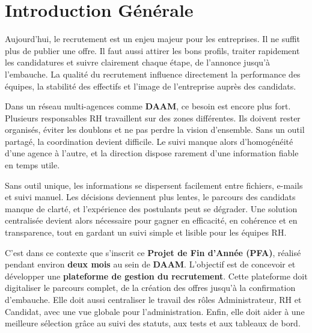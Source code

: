 \chapter*{Introduction Générale}
\thispagestyle{plain}

\begingroup
{}
\setlength{\parskip}{0.55em}

Aujourd'hui, le recrutement est un enjeu majeur pour les entreprises. Il ne
suffit plus de publier une offre. Il faut aussi attirer les bons profils, traiter
rapidement les candidatures et suivre clairement chaque étape, de l'annonce
jusqu'à l'embauche. La qualité du recrutement influence directement la performance
des équipes, la stabilité des effectifs et l'image de l'entreprise auprès des
candidats.

Dans un réseau multi-agences comme \textbf{DAAM}, ce besoin est encore plus fort.
Plusieurs responsables RH travaillent sur des zones différentes. Ils doivent rester
organisés, éviter les doublons et ne pas perdre la vision d'ensemble. Sans un outil
partagé, la coordination devient difficile. Le suivi manque alors d'homogénéité
d'une agence à l'autre, et la direction dispose rarement d'une information fiable
en temps utile.

Sans outil unique, les informations se dispersent facilement entre fichiers, e-mails
et suivi manuel. Les décisions deviennent plus lentes, le parcours des candidats
manque de clarté, et l'expérience des postulants peut se dégrader. Une solution
centralisée devient alors nécessaire pour gagner en efficacité, en cohérence et
en transparence, tout en gardant un suivi simple et lisible pour les équipes RH.

C'est dans ce contexte que s'inscrit ce \textbf{Projet de Fin d'Année (PFA)},
réalisé pendant environ \textbf{deux mois} au sein de \textbf{DAAM}. L'objectif
est de concevoir et développer une \textbf{plateforme de gestion du recrutement}.
Cette plateforme doit digitaliser le parcours complet, de la création des offres
jusqu'à la confirmation d'embauche. Elle doit aussi centraliser le travail des
rôles Administrateur, RH et Candidat, avec une vue globale pour l'administration.
Enfin, elle doit aider à une meilleure sélection grâce au suivi des statuts,
aux tests et aux tableaux de bord.

